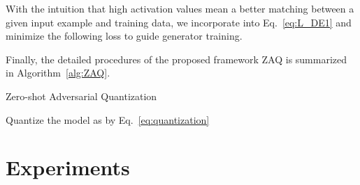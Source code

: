 \documentclass[final]{cvpr}
\begin{document}
With the intuition that high activation values mean a better matching between a given input example and training data, we incorporate  into Eq.~\ref{eq:L_DE1} and minimize the following loss to guide generator training.


Finally, the detailed procedures of the proposed framework ZAQ is summarized in Algorithm~\ref{alg:ZAQ}.

\begin{algorithm}[ht]
  \caption{Zero-shot Adversarial Quantization}
  \label{alg:ZAQ}
  \SetAlgoLined
  \LinesNumbered
{}
  Quantize the model  as  by Eq.~\ref{eq:quantization}\;

\end{algorithm}

\section{Experiments}
\end{document}
